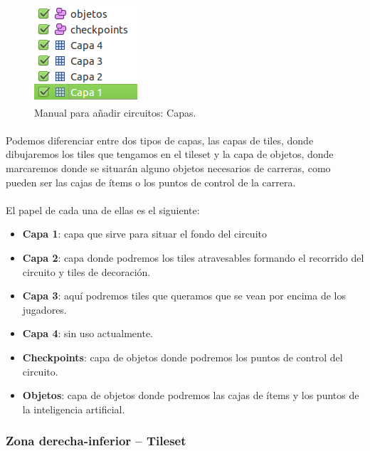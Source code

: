 \begin{figure}[H]
  \label{capas}
  \begin{center}
    \includegraphics[scale=1]{imagenes/manualcircuito/capas.png}
  \end{center}
  \caption{Manual para añadir circuitos: Capas.}
\end{figure}

\paragraph{}
Podemos diferenciar entre dos tipos de capas, las capas de tiles, donde dibujaremos los tiles que tengamos en el tileset y la 
capa de objetos, donde marcaremos donde se situarán alguno objetos necesarios
de carreras, como pueden ser las cajas de ítems
o los puntos de control de la carrera.

\paragraph{}
El papel de cada una de ellas es el siguiente:

\begin{itemize}
    \item \textbf{Capa 1}: capa que sirve para situar el fondo del circuito
    \item \textbf{Capa 2}: capa donde podremos los tiles atravesables formando el recorrido del circuito y tiles de decoración.
    \item \textbf{Capa 3}: aquí podremos tiles que queramos que se vean por encima de los jugadores.
    \item \textbf{Capa 4}: sin uso actualmente.
    \item \textbf{Checkpoints}: capa de objetos donde podremos los puntos de control del circuito.
    \item \textbf{Objetos}: capa de objetos donde podremos las cajas de ítems y los puntos de la inteligencia artificial.
\end{itemize}

\subsubsection{Zona derecha-inferior -- Tileset}

